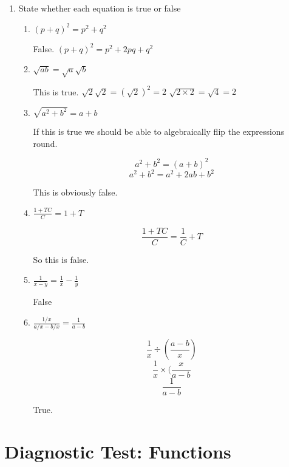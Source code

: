 \documentclass{article}
\begin{document}
\begin{enumerate}
	\item State whether each equation is true or false

	\begin{enumerate}

		\item $(p + q)^2 = p^2 + q^2$
		
			False. $(p + q)^2 = p^2 + 2pq + q^2$

		\item $\sqrt{ab} = \sqrt{a}\sqrt{b}$

			This is true.
			$\sqrt{2}\sqrt{2} = (\sqrt{2})^2 = 2$
			$\sqrt{2\times2} = \sqrt{4} = 2$

		\item $\sqrt{a^2 + b^2} = a +  b$

			If this is true we should be able to algebraically flip the expressions round.

			$$a^2 + b^2 = (a + b)^2$$
			$$a^2 + b^2 = a^2 + 2ab + b^2$$

			This is obviously false.

		\item $\frac{1 + TC}{C} = 1 + T$

			$$\frac{1 + TC}{C} = \frac{1}{C} + T$$

			So this is false.

		\item $\frac{1}{x - y} = \frac{1}{x} - \frac{1}{y}$

			False

		\item $\frac{1/x}{a/x - b/x} = \frac{1}{a-b}$

			$$\frac{1}{x} \div (\frac{a - b}{x})$$
			$$\frac{1}{x} \times (\frac{x}{a-b}$$
			$$\frac{1}{a-b}$$

			True.
	\end{enumerate}

\end{enumerate}

\section{Diagnostic Test: Functions}
\end{document}
